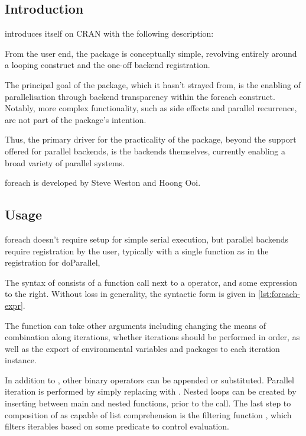 \subsection{Introduction}\label{sec:foreach-introduction}

 introduces itself on CRAN with the following description:


From the user end, the package is conceptually simple, revolving
entirely around a looping construct and the one-off backend
registration.

The principal goal of the package, which it hasn't strayed from, is the
enabling of parallelisation through backend transparency within the
foreach construct. Notably, more complex functionality, such as side
effects and parallel recurrence, are not part of the package's
intention.

Thus, the primary driver for the practicality of the package, beyond the
support offered for parallel backends, is the backends themselves,
currently enabling a broad variety of parallel systems.

foreach is developed by Steve Weston and Hoong Ooi.

\subsection{Usage}\label{sec:usage}

foreach doesn't require setup for simple serial execution, but parallel
backends require registration by the user, typically with a single
function as in the registration for doParallel, 

The syntax of  consists of a 
 function call next to a  operator, and some expression to the
right\cite{weston19:_using}. Without loss in generality, the syntactic
form is given in \cref{lst:foreach-expr}.


The  function can take other
arguments including changing the means of combination along iterations,
whether iterations should be performed in order, as well as the export
of environmental variables and packages to each iteration instance.

In addition to , other binary operators can be appended
or substituted. Parallel iteration is performed by simply replacing
 with . Nested loops can be created by
inserting  between main and nested  functions,
prior to the  call\cite{weston19:_nestin_loops}. The
last step to composition of  as capable of list comprehension is
the filtering function , which filters iterables based
on some predicate to control evaluation.

